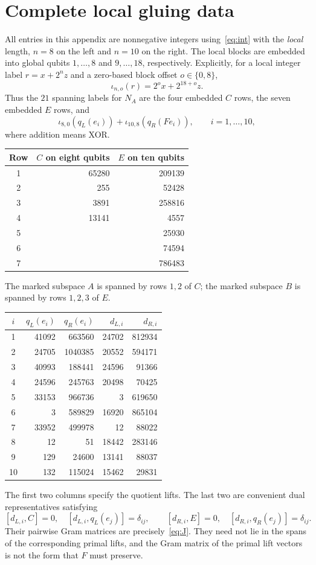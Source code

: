 \documentclass[11pt,a4paper]{article}
\begin{document}
\section{Complete local gluing data}\label{app:local}
All entries in this appendix are nonnegative integers using~\eqref{eq:int} with the \emph{local} length, $n=8$ on the left and $n=10$ on the right. The local blocks are embedded into global qubits $1,\ldots,8$ and $9,\ldots,18$, respectively. Explicitly, for a local integer label $r=x+2^n z$ and a zero-based block offset $o\in\{0,8\}$,
\begin{equation}
 \iota_{n,o}(r)=2^o x+2^{18+o}z.
\end{equation}
Thus the $21$ spanning labels for $N_A$ are the four embedded $C$ rows, the seven embedded $E$ rows, and
\[
 \iota_{8,0}(q_L(e_i))+\iota_{10,8}(q_R(Fe_i)),\qquad i=1,\ldots,10,
\]
where addition means XOR.

\begin{center}
\begin{tabular}{@{}crr@{}}\toprule
Row&$C$ on eight qubits&$E$ on ten qubits\\\midrule
1&65280&209139\\
2&255&52428\\
3&3891&258816\\
4&13141&4557\\
5& &25930\\
6& &74594\\
7& &786483\\\bottomrule
\end{tabular}
\end{center}
The marked subspace $A$ is spanned by rows $1,2$ of $C$; the marked subspace $B$ is spanned by rows $1,2,3$ of $E$.

\begin{center}
\begin{tabular}{@{}crrrr@{}}\toprule
$i$&$q_L(e_i)$&$q_R(e_i)$&$d_{L,i}$&$d_{R,i}$\\\midrule
1&41092&663560&24702&812934\\
2&24705&1040385&20552&594171\\
3&40993&188441&24596&91366\\
4&24596&245763&20498&70425\\
5&33153&966736&3&619650\\
6&3&589829&16920&865104\\
7&33952&499978&12&88022\\
8&12&51&18442&283146\\
9&129&24600&13141&88037\\
10&132&115024&15462&29831\\\bottomrule
\end{tabular}
\end{center}
The first two columns specify the quotient lifts. The last two are convenient dual representatives satisfying
\[
 [d_{L,i},C]=0,\quad[d_{L,i},q_L(e_j)]=\delta_{ij},\qquad
 [d_{R,i},E]=0,\quad[d_{R,i},q_R(e_j)]=\delta_{ij}.
\]
Their pairwise Gram matrices are precisely~\eqref{eq:J}. They need not lie in the spans of the corresponding primal lifts, and the Gram matrix of the primal lift vectors is not the form that $F$ must preserve.
\end{document}
